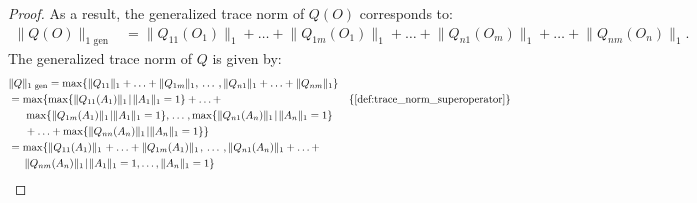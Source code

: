 \begin{proof}
As a result, the generalized trace norm of $Q(O)$ corresponds to:
\begin{equation} \label{eq:qo}
  \begin{split}
  \lVert Q(O)  \rVert_{1 \text{ gen}} & = \lVert Q_{11} (O_{1}) \rVert_{1} + \ldots + \lVert Q_{1m} (O_{1}) \rVert_{1} + \ldots +  \lVert Q_{n1} (O_{m})  \rVert_{1} +  \ldots +  \lVert Q_{nm} (O_{n}) \rVert_{1}. 
  \end{split}
\end {equation}
The generalized trace norm of $Q$ is given by:
\begin{equation}
  \begin{split} \label{eq:q}
  &\lVert Q  \rVert_{1 \text{ gen}} = \max \{ \lVert Q_{11} \rVert_{1} + \ldots + \lVert Q_{1m} \rVert_{1}, \hspace{2pt} \ldots \hspace{2pt}, \lVert Q_{n1} \rVert_{1} + \ldots + \lVert Q_{nm} \rVert_{1} \} \\
 & = \max \{ \max \{ \lVert Q_{11} (A_{1}) \rVert_{1} \hspace{1pt}  \vert \hspace{1pt}  \lVert A_{1} \rVert_{1} = 1 \} + \ldots + &  \{\text{\autoref{def:trace_norm_superoperator}}\} \\
 & \hspace{15pt}  \max \{  \lVert Q_{1m} (A_{1}) \rVert_{1} \hspace{1pt}  \vert   \lVert A_{1} \rVert_{1} = 1 \} , \hspace{1pt} \ldots \hspace{1pt}, \max \{ \lVert Q_{n1} (A_{n}) \rVert_{1} \hspace{1pt}  \vert \hspace{1pt}  \lVert A_{n} \rVert_{1} = 1 \}   \\
 &\hspace{15pt} + \ldots +  \max \{ \lVert Q_{nn} (A_{n}) \rVert_{1} \hspace{1pt}  \vert \lVert A_{n} \rVert_{1} = 1 \}\}\\
 & = \max \{ \lVert Q_{11} (A_{1}) \rVert_{1} \hspace{1pt}  + \ldots +  \lVert Q_{1m} (A_{1}) \rVert_{1} \hspace{1pt} , \hspace{2pt} \ldots \hspace{2pt}, \lVert Q_{n1} (A_{n}) \rVert_{1}  + \ldots +  \\
 & \hspace{15pt} \lVert Q_{nm} (A_{n}) \rVert_{1} \hspace{1pt}  \vert \hspace{1pt}   \lVert A_{1} \rVert_{1} = 1, \ldots, \lVert A_{n} \rVert_{1} = 1 \}
  \end{split}
\end{equation}



\end{proof}
